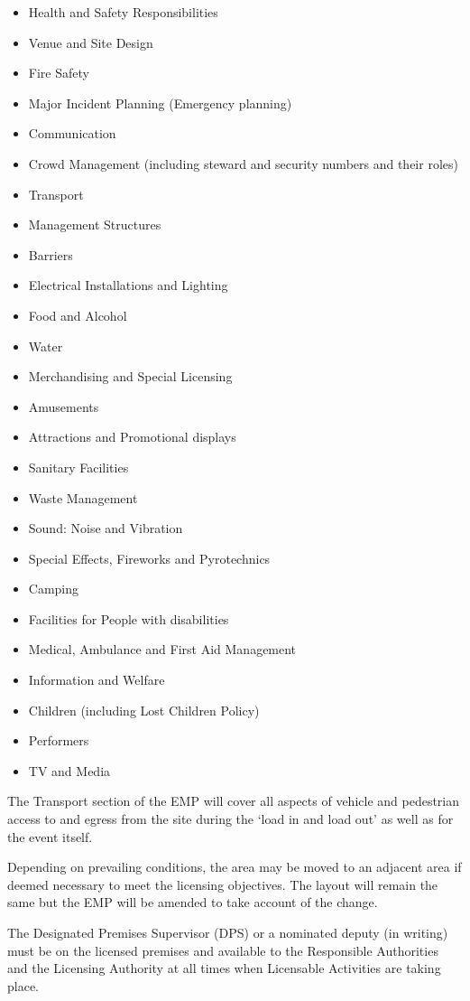 \begin{itemize}
\tightlist
\item Health and Safety Responsibilities
\item Venue and Site Design
\item Fire Safety
\item Major Incident Planning (Emergency planning)
\item Communication
\item Crowd Management (including steward and security numbers and their roles)
\item Transport
\item Management Structures
\item Barriers
\item Electrical Installations and Lighting
\item Food and Alcohol
\item Water
\item Merchandising and Special Licensing
\item Amusements
\item Attractions and Promotional displays
\item Sanitary Facilities
\item Waste Management
\item Sound: Noise and Vibration
\item Special Effects, Fireworks and Pyrotechnics
\item Camping
\item Facilities for People with disabilities
\item Medical, Ambulance and First Aid Management
\item Information and Welfare
\item Children (including Lost Children Policy)
\item Performers
\item TV and Media
\end{itemize}

The Transport section of the EMP will cover all aspects of vehicle and
pedestrian access to and egress from the site during the `load in and
load out' as well as for the event itself.

Depending on prevailing conditions, the area may be moved to an adjacent
area if deemed necessary to meet the licensing objectives. The layout
will remain the same but the EMP will be amended to take account of the
change.

The Designated Premises Supervisor (DPS) or a nominated deputy (in writing) must be
on the licensed premises and available to the Responsible Authorities
and the Licensing Authority at all times when Licensable Activities are
taking place.

